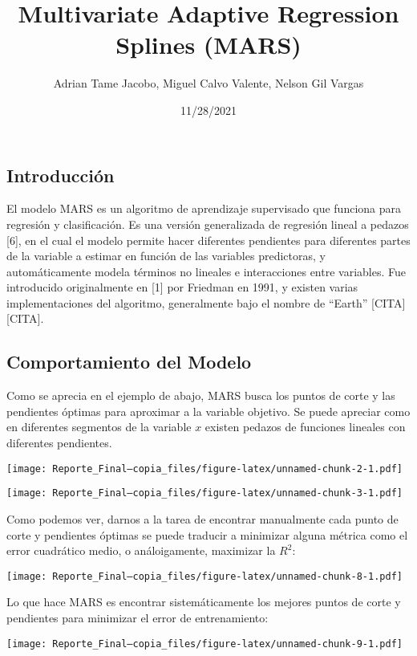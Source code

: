 \documentclass[
]{article}
\title{Multivariate Adaptive Regression Splines (MARS)}
\author{Adrian Tame Jacobo, Miguel Calvo Valente, Nelson Gil Vargas}
\date{11/28/2021}
\begin{document}
\maketitle

\hypertarget{introducciuxf3n}{%
\subsection{Introducción}\label{introducciuxf3n}}

El modelo MARS es un algoritmo de aprendizaje supervisado que funciona
para regresión y clasificación. Es una versión generalizada de regresión
lineal a pedazos {[}6{]}, en el cual el modelo permite hacer diferentes
pendientes para diferentes partes de la variable a estimar en función de
las variables predictoras, y automáticamente modela términos no lineales
e interacciones entre variables. Fue introducido originalmente en
{[}1{]} por Friedman en 1991, y existen varias implementaciones del
algoritmo, generalmente bajo el nombre de ``Earth'' {[}CITA{]}
{[}CITA{]}.

\hypertarget{comportamiento-del-modelo}{%
\subsection{Comportamiento del Modelo}\label{comportamiento-del-modelo}}

Como se aprecia en el ejemplo de abajo, MARS busca los puntos de corte y
las pendientes óptimas para aproximar a la variable objetivo. Se puede
apreciar como en diferentes segmentos de la variable \(x\) existen
pedazos de funciones lineales con diferentes pendientes.

\texttt{[image: Reporte\_Final---copia\_files/figure-latex/unnamed-chunk-2-1.pdf]}

\texttt{[image: Reporte\_Final---copia\_files/figure-latex/unnamed-chunk-3-1.pdf]}

Como podemos ver, darnos a la tarea de encontrar manualmente cada punto
de corte y pendientes óptimas se puede traducir a minimizar alguna
métrica como el error cuadrático medio, o análoigamente, maximizar la
\(R^2\):

\texttt{[image: Reporte\_Final---copia\_files/figure-latex/unnamed-chunk-8-1.pdf]}

Lo que hace MARS es encontrar sistemáticamente los mejores puntos de
corte y pendientes para minimizar el error de entrenamiento:

\texttt{[image: Reporte\_Final---copia\_files/figure-latex/unnamed-chunk-9-1.pdf]}
\end{document}
